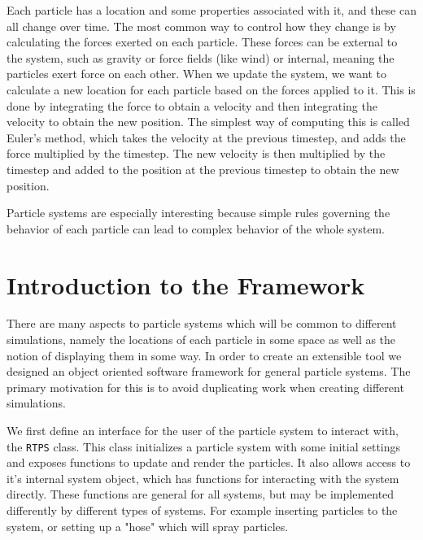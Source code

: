 Each particle has a location and some properties associated with it, and these
can all change over time. The most common way to control how they change is by
calculating the forces exerted on each particle. These forces can be external
to the system, such as gravity or force fields (like wind) or internal, meaning
the particles exert force on each other. When we update the system, we want to
calculate a new location for each particle based on the forces applied to it.
This is done by integrating the force to obtain a velocity and then integrating
the velocity to obtain the new position.
The simplest way of computing this is called Euler's method, which takes the
velocity at the previous timestep, and adds the force multiplied by the
timestep. The new velocity is then multiplied by the timestep and added to the
position at the previous timestep to obtain the new position.

\begin{comment}
\begin{figure}[!htc]
 		\centering
		\texttt{[image: figures/eulers\_method.png]}
		\label{fig:logic}
        \caption{ A Particle moving according to forces }
\end{figure}
show a particle's path over time with dotted previous particles. have a reference curve which is the velocity function
we should end up with a streamline where the viewer can see the state at each previous timestep
\end{comment}


Particle systems are especially interesting because simple rules governing the behavior of
each particle can lead to complex behavior of the whole system. 




\section{Introduction to the Framework}

There are many aspects to particle systems which will be common to different
simulations, namely the locations of each particle in some space as well as the
notion of displaying them in some way. In order to create an extensible tool we
designed an object oriented software framework for general particle systems.
The primary motivation for this is to avoid duplicating work when creating
different simulations.


We first define an interface for the user of the particle system to interact
with, the \verb|RTPS| class. This class initializes a particle system with some
initial settings and exposes functions to update and render the particles. It
also allows access to it's internal system object, which has functions for
interacting with the system directly. These functions are general for all
systems, but may be implemented differently by different types of systems. For
example inserting particles to the system, or setting up a "hose" which will
spray particles.


